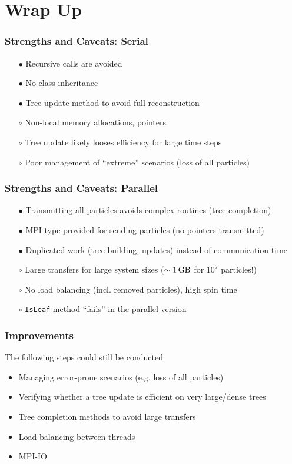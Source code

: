 \section{Wrap Up}

\begin{frame}
	\frametitle{Strengths and Caveats: Serial}
	\begin{itemize}
		\item[$\bullet$] Recursive calls are avoided
		\item[$\bullet$] No class inheritance
		\item[$\bullet$] Tree update method to avoid full reconstruction
		\pause
		\item[$\circ$] Non-local memory allocations, pointers
		\item[$\circ$] Tree update likely looses efficiency for large time steps
		\item[$\circ$] Poor management of ``extreme'' scenarios (loss of all particles)
	\end{itemize}
\end{frame}

\begin{frame}[fragile]
\frametitle{Strengths and Caveats: Parallel}
	\begin{itemize}
		\item[$\bullet$] Transmitting all particles avoids complex routines (tree completion)
		\item[$\bullet$] MPI type provided for sending particles (no pointers transmitted)
		\item[$\bullet$] Duplicated work (tree building, updates) instead of communication time
		\item[$\circ$] Large transfers for large system sizes ($\sim\SI{1}{\giga\byte}$ for $10^7$ particles!)
		\item[$\circ$] No load balancing (incl. removed particles), high spin time
		\item[$\circ$] \lstinline|IsLeaf| method ``fails'' in the parallel version
	\end{itemize}
\end{frame}

\begin{frame}
\frametitle{Improvements}
	The following steps could still be conducted
	\begin{itemize}
		\item Managing error-prone scenarios (e.g. loss of all particles)
		\item Verifying whether a tree update is efficient on very large/dense trees
		\item Tree completion methods to avoid large transfers
		\item Load balancing between threads
		\item MPI-IO
	\end{itemize}
\end{frame}